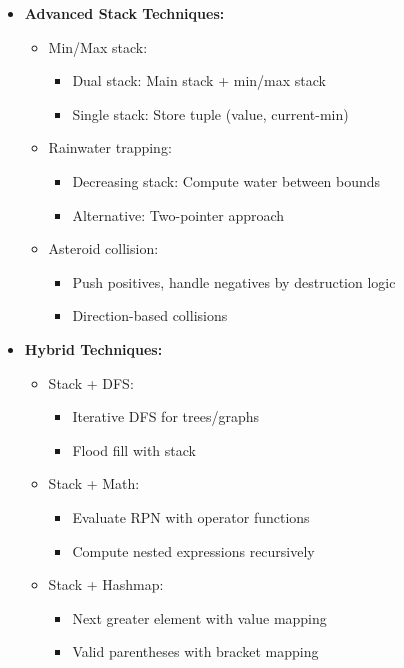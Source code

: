 \documentclass[a4paper,10pt]{book}
\begin{document}
\begin{itemize}
    \item \textbf{Advanced Stack Techniques:}
    \begin{itemize}
        \item Min/Max stack:
        \begin{itemize}
            \item Dual stack: Main stack + min/max stack
            \item Single stack: Store tuple (value, current-min)
        \end{itemize}
        \item Rainwater trapping:
        \begin{itemize}
            \item Decreasing stack: Compute water between bounds
            \item Alternative: Two-pointer approach
        \end{itemize}
        \item Asteroid collision:
        \begin{itemize}
            \item Push positives, handle negatives by destruction logic
            \item Direction-based collisions
        \end{itemize}
    \end{itemize}
    
    \item \textbf{Hybrid Techniques:}
    \begin{itemize}
        \item Stack + DFS:
        \begin{itemize}
            \item Iterative DFS for trees/graphs
            \item Flood fill with stack
        \end{itemize}
        \item Stack + Math:
        \begin{itemize}
            \item Evaluate RPN with operator functions
            \item Compute nested expressions recursively
        \end{itemize}
        \item Stack + Hashmap:
        \begin{itemize}
            \item Next greater element with value mapping
            \item Valid parentheses with bracket mapping
        \end{itemize}
    \end{itemize}
    

\end{itemize}
\end{document}
